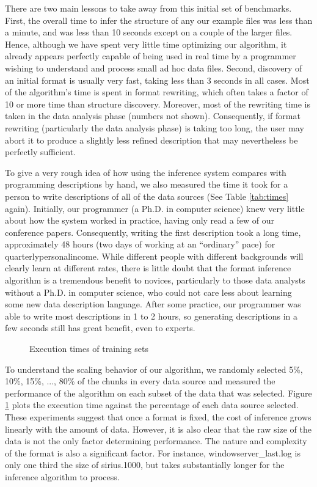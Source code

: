 There are two main lessons to take away from this initial set of
benchmarks.  First, the overall time to infer the structure of any our
example files was less than a minute, and was less than 10 seconds
except on a couple of the larger files.  Hence, although we have spent
very little time optimizing our algorithm, it already appears
perfectly capable of being used in real time by a programmer wishing
to understand and process small ad hoc data files.  Second, discovery
of an initial format is usually very fast, taking less than 3 seconds
in all cases.  Most of the algorithm's time is spent in format rewriting, which
often takes a factor of 10 or more time than structure discovery.  Moreover, most of the
rewriting time is taken in the data analysis phase (numbers not
shown).  Consequently, if format rewriting (particularly the data analysis phase)
is taking too long, the user may abort it to produce a 
slightly less refined description that may nevertheless be perfectly sufficient.

To give a very rough idea of how using the inference system compares with programming
descriptions by hand, we also measured the time it took for a person to write descriptions of
all of the data sources (See Table \ref{tab:times} again).  
Initially, our programmer (a Ph.D. in computer science)
knew very little about how the \pads{} system
worked in practice, having only read a few of our conference papers.  Consequently, writing
the first description took a long time, approximately 48 hours (two days of working at
an ``ordinary'' pace) for quarterlypersonalincome.  While different people with different 
backgrounds will clearly learn at different rates, there is little doubt that the
format inference algorithm is a tremendous benefit to novices, particularly
to those data analysts without a Ph.D. in computer science, who could not care less about
learning some new data description language.  After some practice, our programmer was
able to write most descriptions in 1 to 2 hours, so generating descriptions in a few
seconds still has great benefit, even to experts.

\begin{figure}
\caption{Execution times of training sets} \label{fig:traintime} \shrink
\end{figure}

To understand the scaling behavior of our algorithm, we
randomly selected 5\%, 10\%, 15\%, ..., 80\% of the chunks in every data source
and measured the performance of the algorithm on each subset of the data that was
selected. Figure \ref{fig:traintime}
plots the execution time against the percentage of each data source selected.
These experiments suggest that once a format is fixed, the cost of inference
grows linearly with the amount of data.  However, it is also clear that the raw
size of the data is not the only factor determining performance.  The nature and complexity
of the format is also a significant factor.  For instance, windowserver\_last.log
is only one third the size of sirius.1000, but takes substantially longer 
for the inference algorithm to process.

